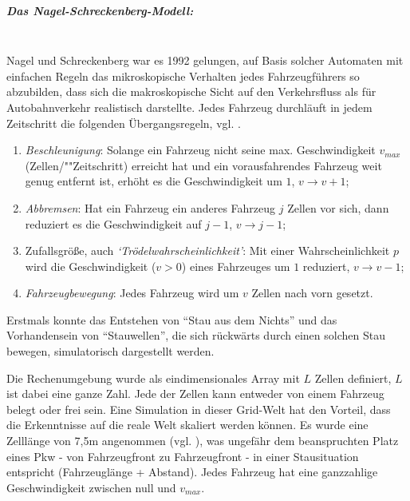 \subparagraph{Das Nagel-Schreckenberg-Modell:}
\label{sec:na-sch}
\hfill \\
Nagel und Schreckenberg war es 1992 gelungen, auf Basis solcher Automaten mit einfachen Regeln das mikroskopische Verhalten jedes Fahr\-zeug\-füh\-rers so abzubilden, dass sich die makroskopische Sicht auf den Verkehrsfluss als für Autobahnverkehr realistisch darstellte. 
Jedes Fahrzeug durchläuft in jedem Zeitschritt die folgenden Übergangsregeln, vgl. \cite{na-sch}. 

\begin{enumerate}
	\item \textit{Beschleunigung}: Solange ein Fahrzeug nicht seine max. Geschwindigkeit $v_{max}$ (Zellen/""Zeitschritt) erreicht hat und ein vorausfahrendes Fahrzeug weit genug entfernt ist, erhöht es die Geschwindigkeit um $1$, $v \rightarrow v+1$;
	\item \textit{Abbremsen}: Hat ein Fahrzeug ein anderes Fahrzeug $j$ Zellen vor sich, dann reduziert es die Geschwindigkeit auf $j-1$, $v \rightarrow j-1$;
	\item Zufallsgröße, auch \textit{\enquote*{Trödelwahrscheinlichkeit}}: Mit einer Wahrscheinlichkeit $p$ wird die Geschwindigkeit ($v > 0$) eines Fahrzeuges um $1$ reduziert, $v \rightarrow v-1$;
	\item \textit{Fahrzeugbewegung}: Jedes Fahrzeug wird um $v$ Zellen nach vorn gesetzt.
\end{enumerate}

Erstmals konnte das Entstehen von \enquote{Stau aus dem Nichts} und das Vorhandensein von \enquote{Stauwellen}, die sich rückwärts durch einen solchen Stau bewegen, simulatorisch dargestellt werden.

Die Rechenumgebung wurde als eindimensionales Array mit $L$ Zellen definiert, $L$ ist dabei eine ganze Zahl. 
Jede der Zellen kann entweder von einem Fahrzeug belegt oder frei sein. 
Eine Simulation in dieser Grid-Welt hat den Vorteil, dass die Erkenntnisse auf die reale Welt skaliert werden können. 
Es wurde eine Zelllänge von 7,5\nolinebreak[4] m angenommen (vgl. \cite[S. 2227]{na-sch}), was ungefähr dem beanspruchten Platz eines Pkw - von Fahrzeugfront zu Fahrzeugfront - in einer Stausituation entspricht (Fahrzeuglänge + Abstand). 
Jedes Fahrzeug hat eine ganzzahlige Geschwindigkeit zwischen null und $v_{max}$.

